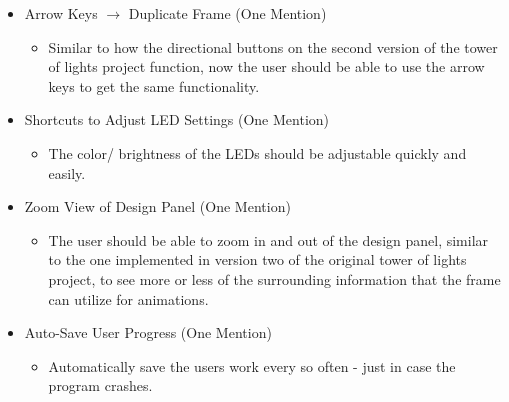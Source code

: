 \documentclass[./spec.tex]{subfiles}
\begin{document}
{\begin{itemize}
\begin{itemize}
	\end{itemize}
	\item Arrow Keys $\rightarrow$ Duplicate Frame (One Mention)
	\begin{itemize}
		\item Similar to how the directional buttons on the second version of the tower of lights project function, now the user should be able to use the arrow keys to get the same functionality.
	\end{itemize}
	\item Shortcuts to Adjust LED Settings (One Mention)
	\begin{itemize}
		\item The color/ brightness of the LEDs should be adjustable quickly and easily.
	\end{itemize}
	\item Zoom View of Design Panel (One Mention)
	\begin{itemize}
		\item The user should be able to zoom in and out of the design panel, similar to the one implemented in version two of the original tower of lights project, to see more or less of the surrounding information that the frame can utilize for animations. 
	\end{itemize}
	\item Auto-Save User Progress (One Mention)
	\begin{itemize}
		\item Automatically save the users work every so often - just in case the program crashes.
	\end{itemize}
\end{itemize}}
\end{document}
